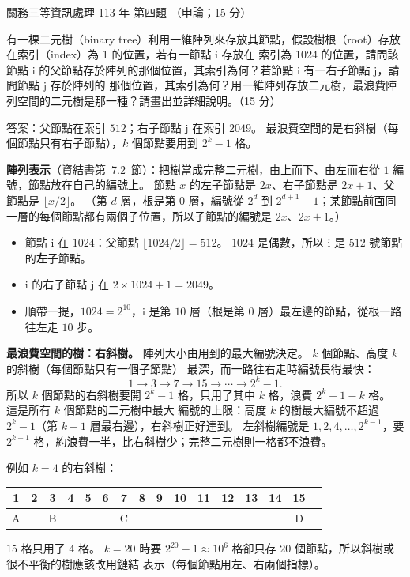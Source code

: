 \begin{pastexam}[label={px:gw3-113-ds-04}]{關務三等資訊處理 113 年 第四題}
（申論；15 分）

有一棵二元樹（binary tree）利用一維陣列來存放其節點，假設樹根（root）存放在索引（index）為 1 的位置，若有一節點 i 存放在
索引為 1024 的位置，請問該節點 i 的父節點存於陣列的那個位置，其索引為何？若節點 i 有一右子節點 j，請問節點 j 存於陣列的
那個位置，其索引為何？用一維陣列存放二元樹，最浪費陣列空間的二元樹是那一種？請畫出並詳細說明。（15 分）
\end{pastexam}

\begin{pastsoln}
答案：父節點在索引 $512$；右子節點 j 在索引 $2049$。 最浪費空間的是右斜樹（每個節點只有右子節點），$k$ 個節點要用到
$2^{k} - 1$ 格。

\textbf{陣列表示}（資結書第~7.2~節）：把樹當成完整二元樹，由上而下、由左而右從 $1$ 編號，節點放在自己的編號上。 節點 $x$
的左子節點是 $2x$、右子節點是 $2x + 1$、父節點是 $\lfloor x/2 \rfloor$。 （第 $d$ 層，根是第 $0$ 層，編號從 $2^{d}$ 到
$2^{d+1} - 1$；某節點前面同一層的每個節點都有兩個子位置，所以子節點的編號是 $2x$、$2x + 1$。）

\begin{itemize}
\item 節點 i 在 $1024$：父節點 $\lfloor 1024 / 2 \rfloor = 512$。 $1024$ 是偶數，所以 i 是 $512$ 號節點的\textbf{左}子節點。
\item i 的右子節點 j 在 $2 \times 1024 + 1 = 2049$。
\item 順帶一提，$1024 = 2^{10}$，i 是第 $10$ 層（根是第 $0$ 層）最左邊的節點，從根一路往左走 $10$ 步。
\end{itemize}

\textbf{最浪費空間的樹：右斜樹。} 陣列大小由用到的最大編號決定。 $k$ 個節點、高度 $k$ 的斜樹（每個節點只有一個子節點）
最深，而一路往右走時編號長得最快：
\[
1 \to 3 \to 7 \to 15 \to \cdots \to 2^{k} - 1.
\]
所以 $k$ 個節點的右斜樹要開 $2^{k} - 1$ 格，只用了其中 $k$ 格，浪費 $2^{k} - 1 - k$ 格。 這是所有 $k$ 個節點的二元樹中最大
編號的上限：高度 $k$ 的樹最大編號不超過 $2^{k} - 1$（第 $k - 1$ 層最右邊），右斜樹正好達到。 左斜樹編號是
$1, 2, 4, \dots, 2^{k-1}$，要 $2^{k-1}$ 格，約浪費一半，比右斜樹少；完整二元樹則一格都不浪費。

例如 $k = 4$ 的右斜樹：
\begin{center}
\qquad
\begin{tabular}[b]{|c|*{15}{c|}}
\hline
1 & 2 & 3 & 4 & 5 & 6 & 7 & 8 & 9 & 10 & 11 & 12 & 13 & 14 & 15 \\ \hline
A & & B & & & & C & & & & & & & & D \\ \hline
\end{tabular}
\end{center}
$15$ 格只用了 $4$ 格。 $k = 20$ 時要 $2^{20} - 1 \approx 10^{6}$ 格卻只存 $20$ 個節點，所以斜樹或很不平衡的樹應該改用鏈結
表示（每個節點用左、右兩個指標）。
\end{pastsoln}
